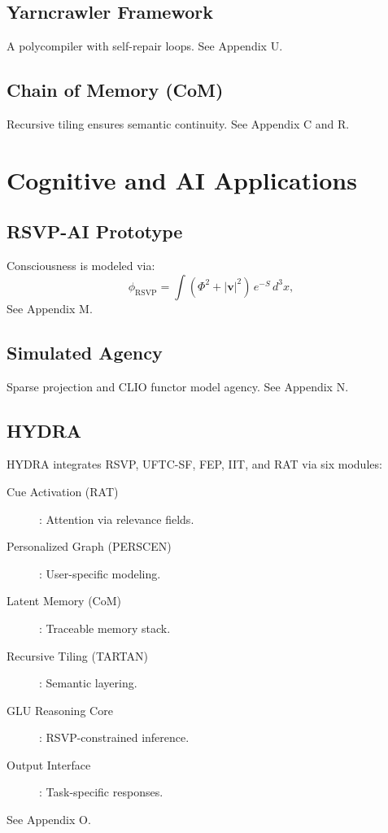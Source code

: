 \documentclass[12pt]{report}
\newcommand{\PhiRSVP}{\Phi}
\newcommand{\vRSVP}{\mathbf{v}}
\newcommand{\SRSVP}{S}
\newcommand{\phirsvp}{\phi_{\text{RSVP}}}
\begin{document}
\chapter{Yarncrawler Framework}
A polycompiler with self-repair loops. See Appendix U.

\chapter{Chain of Memory (CoM)}
Recursive tiling ensures semantic continuity. See Appendix C and R.

\part{Cognitive and AI Applications}

\chapter{RSVP-AI Prototype}
Consciousness is modeled via:
\begin{equation}
\phirsvp = \int (\PhiRSVP^2 + |\vRSVP|^2) \, e^{-\SRSVP} \, d^3x, \label{eq:phirsvp}
\end{equation}
See Appendix M.

\chapter{Simulated Agency}
Sparse projection and CLIO functor model agency. See Appendix N.

\chapter{HYDRA}
HYDRA integrates RSVP, UFTC-SF, FEP, IIT, and RAT via six modules:
\begin{description}
    \item[Cue Activation (RAT)]: Attention via relevance fields.
    \item[Personalized Graph (PERSCEN)]: User-specific modeling.
    \item[Latent Memory (CoM)]: Traceable memory stack.
    \item[Recursive Tiling (TARTAN)]: Semantic layering.
    \item[GLU Reasoning Core]: RSVP-constrained inference.
    \item[Output Interface]: Task-specific responses.
\end{description}
See Appendix O.
\end{document}
